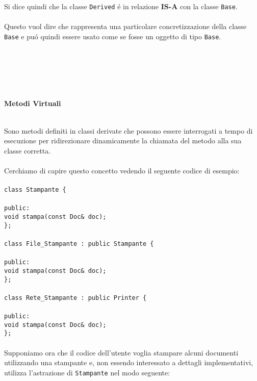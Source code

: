 \documentclass{article}
\newcommand\tab[1][1cm]{\hspace*{#1}}
\begin{document}
Si dice quindi che la classe \texttt{Derived} \'e in relazione \textbf{IS-A} con la classe \texttt{Base}.\\ \\Questo vuol dire che rappresenta una particolare concretizzazione della classe \texttt{Base} e pu\'o quindi essere usato come se fosse un oggetto di tipo \texttt{Base}.
\\ \\ \\ \\ \\ \\
\begin{large}\textbf{\textcolor{blu}{Metodi Virtuali}} \\ \\ \end{large}
Sono metodi definiti in classi derivate che possono essere interrogati a tempo di esecuzione per ridirezionare dinamicamente la chiamata del metodo alla sua classe corretta.\\ \\Cerchiamo di capire questo concetto vedendo il seguente codice di esempio: \\ \\
\texttt{class Stampante \{ \\ \\ \tab public: \\ \tab \tab void stampa(const Doc\& doc); \\ \}; \\ \\ class File\_Stampante : public Stampante \{ \\ \\ \tab public: \\ \tab \tab void stampa(const Doc\& doc); \\ \}; \\ \\ class Rete\_Stampante : public Printer \{ \\ \\ \tab public: \\ \tab \tab void stampa(const Doc\& doc); \\ \};} \\ \\Supponiamo ora che il codice dell'utente voglia stampare alcuni documenti utilizzando una stampante e, non essendo interessato a dettagli implementativi, utilizza l'astrazione di \texttt{Stampante} nel modo seguente: \\ \\
\end{document}
